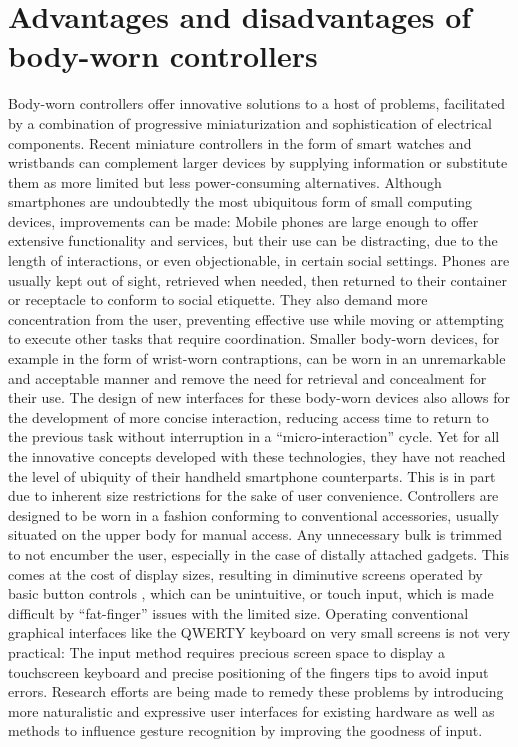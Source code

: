 \documentclass{sigchi}
\begin{document}
\section{Advantages and disadvantages of body-worn controllers}
Body-worn controllers offer innovative solutions to a host of problems, facilitated by a combination of progressive miniaturization and sophistication of electrical components. Recent miniature controllers in the form of smart watches and wristbands can complement larger devices by supplying information or substitute them as more limited but less power-consuming alternatives. \cite{motion-ui} Although smartphones are undoubtedly the most ubiquitous form of small computing devices, improvements can be made: Mobile phones are large enough to offer extensive functionality and services, but their use can be distracting, due to the length of interactions, or even objectionable, in certain social settings. Phones are usually kept out of sight, retrieved when needed, then returned to their container or receptacle to conform to social etiquette. They also demand more concentration from the user, preventing effective use while moving or attempting to execute other tasks that require coordination. Smaller body-worn devices, for example in the form of wrist-worn contraptions, can be worn in an unremarkable and acceptable manner and remove the need for retrieval and concealment for their use. The design of new interfaces for these body-worn devices also allows for the development of more concise interaction, reducing access time to return to the previous task without interruption in a “micro-interaction” cycle. \cite{microinteraction}
Yet for all the innovative concepts developed with these technologies, they have not reached the level of ubiquity of their handheld smartphone counterparts.
This is in part due to inherent size restrictions for the sake of user convenience. Controllers are designed to be worn in a fashion conforming to conventional accessories, usually situated on the upper body for manual access. Any unnecessary bulk is trimmed to not encumber the user, especially in the case of distally attached gadgets. This comes at the cost of display sizes, resulting in diminutive screens operated by basic button controls , which can be unintuitive, or touch input, which is made difficult by “fat-finger” issues with the limited size. Operating conventional graphical interfaces like the QWERTY keyboard on very small screens is not very practical: The input method requires precious screen space to display a touchscreen keyboard and precise positioning of the fingers tips to avoid input errors. \cite{vogel7} Research efforts are being made to remedy these problems by introducing more naturalistic and expressive user interfaces for existing hardware as well as methods to influence gesture recognition by improving the goodness of input. \cite{motion-ui, vogel7} %
\end{document}
